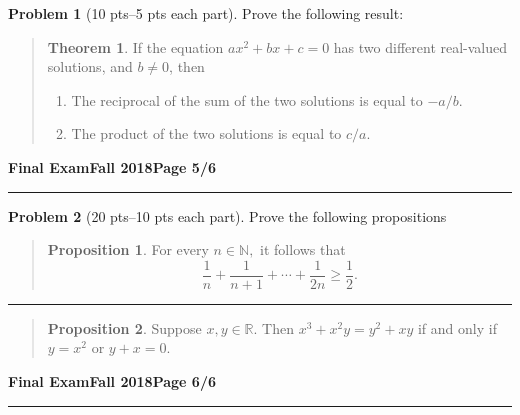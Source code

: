\documentclass[11pt]{article}
\theoremstyle{definition}
\newtheorem{problem}{Problem}
\theoremstyle{theorem}
\newtheorem*{theorem}{Theorem}
\newtheorem{proposition}{Proposition}
\begin{document}
\begin{problem}[10 pts--5 pts each part]
  Prove the following result:
  \vspace{-0.75cm}
  \begin{quotation}
    \begin{theorem}
      If the equation $ax^2+bx+c=0$ has two different real-valued solutions, and $b\neq 0$, then
      \begin{enumerate}
      \item The reciprocal of the sum of the two solutions is equal to $-a/b$.
      \item The product of the two solutions is equal to $c/a$.
      \end{enumerate}
    \end{theorem}
  \end{quotation}
\end{problem}
\newpage

\hfill{\large\bf Final Exam}\hfill{\large\bf Fall 2018}\hfill{\large\bf Page 5/6}\hrule

\bigskip
\begin{problem}[20 pts--10 pts each part]
  Prove the following propositions
  \vspace{-1cm}
  \begin{quotation}
    \begin{proposition}
      For every $n \in \mathbb{N},$ it follows that 
      \begin{equation*}
        \frac{1}{n} + \frac{1}{n+1} + \dotsb + \frac{1}{2n} \geq \frac{1}{2}. 
      \end{equation*}
    \end{proposition}
  \end{quotation}
  \vspace{9.5cm}
  \hrule
  \begin{quotation}
    \begin{proposition}
      Suppose $x,y \in \mathbb{R}.$  Then $x^3+x^2y=y^2+xy$ if and only if $y=x^2$ or $y+x=0$.
    \end{proposition}
  \end{quotation}
\end{problem}
\newpage

\hfill{\large\bf Final Exam}\hfill{\large\bf Fall 2018}\hfill{\large\bf Page 6/6}\hrule
\end{document}
